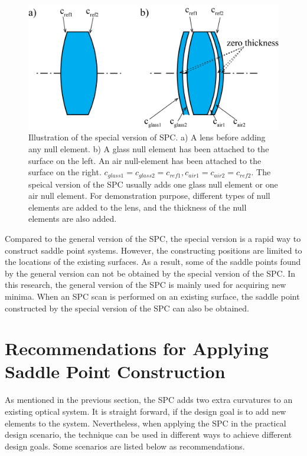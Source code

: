 \begin{figure}[h!]
    \centering
    \includegraphics[scale=0.45]{chapter-2/figures/SPCS_illus.png}
    \caption{Illustration of the special version of SPC. a) A lens before adding any null element. b)  A glass null element has been attached to the surface on the left. An air null-element has been attached to the surface on the right. $c_{glass1} = c_{glass2} = c_{ref1}, c_{air1} = c_{air2} = c_{ref2}$. The speical version of the SPC usually adds one glass null element or one air null element. For demonstration purpose, different types of null elements are added to the lens, and the thickness of the null elements are also added.}
    \label{fig:SPCS-illus}
\end{figure}

Compared to the general version of the SPC, the special version is a rapid way to construct saddle point systems. However, the constructing positions are limited to the locations of the existing surfaces. As a result, some of the saddle points found by the general version can not be obtained by the special version of the SPC. In this research, the general version of the SPC is mainly used for acquiring new minima. When an SPC scan is performed on an existing surface, the saddle point constructed by the special version of the SPC can also be obtained. 


\section{Recommendations for Applying Saddle Point Construction}\label{section: SPC recommendation}
As mentioned in the previous section, the SPC adds two extra curvatures to an existing optical system. It is straight forward, if the design goal is to add new elements to the system. Nevertheless, when applying the SPC in the practical design scenario, the technique can be used in different ways to achieve different design goals. Some scenarios are listed below as recommendations.

